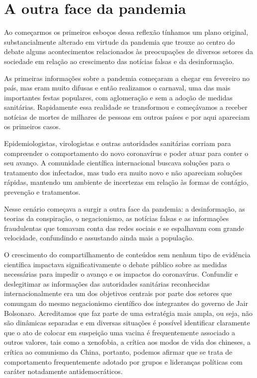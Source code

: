 \chapter{A outra face da pandemia}

Ao começarmos os primeiros esboços dessa reflexão tínhamos um plano
original, substancialmente alterado em virtude da pandemia que trouxe ao
centro do debate alguns acontecimentos relacionados às preocupações de
diversos setores da sociedade em relação ao crescimento das notícias
falsas e da desinformação.

As primeiras informações sobre a pandemia começaram a chegar em
fevereiro no país, mas eram muito difusas e então realizamos o carnaval,
uma das mais importantes festas populares, com aglomeração e sem a
adoção de medidas sanitárias. Rapidamente essa realidade se transformou
e começávamos a receber notícias de mortes de milhares de pessoas em
outros países e por aqui apareciam os primeiros casos.

Epidemiologistas, virologistas e outras autoridades sanitárias corriam
para compreender o comportamento do novo coronavírus e poder atuar para
conter o seu avanço. A comunidade científica internacional buscava
soluções para o tratamento dos infectados, mas tudo era muito novo e não
apareciam soluções rápidas, mantendo um ambiente de incertezas em
relação às formas de contágio, prevenção e tratamentos.

Nesse cenário começava a surgir a outra face da pandemia: a
desinformação, as teorias da conspiração, o negacionismo, as notícias
falsas e as informações fraudulentas que tomavam conta das redes sociais
e se espalhavam com grande velocidade, confundindo e assustando ainda
mais a população.

O crescimento do compartilhamento de conteúdos sem nenhum tipo de
evidência científica impactava significativamente o debate público sobre
as medidas necessárias para impedir o avanço e os impactos do
coronavírus. Confundir e deslegitimar as informações das autoridades
sanitárias reconhecidas internacionalmente era um dos objetivos centrais
por parte dos setores que comungam do mesmo negacionismo científico dos
integrantes do governo de Jair Bolsonaro. Acreditamos que faz parte de
uma estratégia mais ampla, ou seja, não são dinâmicas separadas e em
diversas situações é possível identificar claramente que o ato de
colocar em suspeição uma vacina é frequentemente associado a outros
valores, tais como a xenofobia, a crítica aos modos de vida dos
chineses, a crítica ao comunismo da China, portanto, podemos afirmar que
se trata de comportamento frequentemente adotado por grupos e lideranças
políticas com caráter notadamente antidemocráticos.


